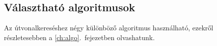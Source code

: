 \subsection{Választható algoritmusok}

Az útvonalkereséshez négy különböző algoritmus használható, ezekről részletesebben a \ref{ch:algo}.~fejezetben olvashatunk.


		
		
		
		
		
		
		
		
